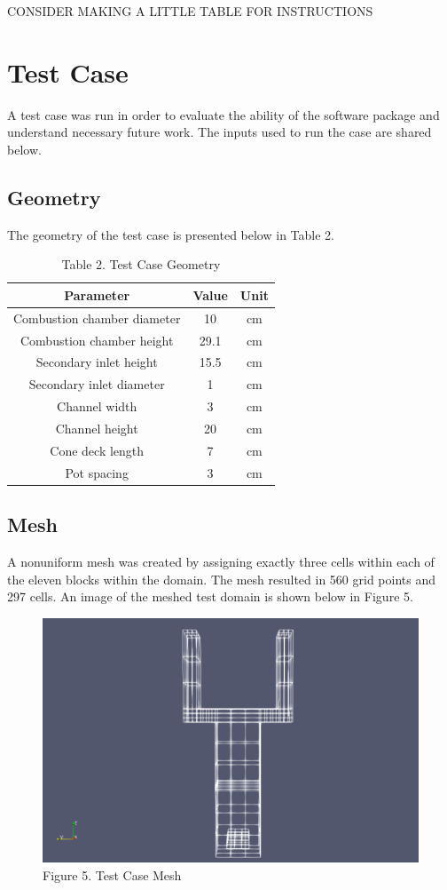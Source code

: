 \documentclass[3p,times,twocolumn]{elsarticle}
\begin{document}
CONSIDER MAKING A LITTLE TABLE FOR INSTRUCTIONS

\section{Test Case}
A test case was run in order to evaluate the ability of the software package and understand necessary future work. The inputs used to run the case are shared below.

\subsection{Geometry}

The geometry of the test case is presented below in Table 2.

\begin{table}{\linewidth}
	\centering
	\begin{tabular}{||c c c||}
		\hline
		Parameter & Value & Unit \\ [0.4ex]
		\hline\hline
		Combustion chamber diameter & 10 & cm \\
		Combustion chamber height & 29.1 & cm \\
		Secondary inlet height & 15.5 & cm \\
		Secondary inlet diameter & 1 & cm \\
		Channel width & 3 & cm \\
		Channel height & 20 & cm \\
		Cone deck length & 7 & cm \\
		Pot spacing & 3 & cm \\
		\hline
	\end{tabular}
	\caption{Table 2. Test Case Geometry}
\end{table}


\subsection{Mesh}
A nonuniform mesh was created by assigning exactly three cells within each of the eleven blocks within the domain. The mesh resulted in 560 grid points and 297 cells. An image of the meshed test domain is shown below in Figure 5.

\begin{figure}{\linewidth}
	\includegraphics[width=\linewidth]{mesh.PNG}
	\caption{Figure 5. Test Case Mesh}
\end{figure}
\end{document}
